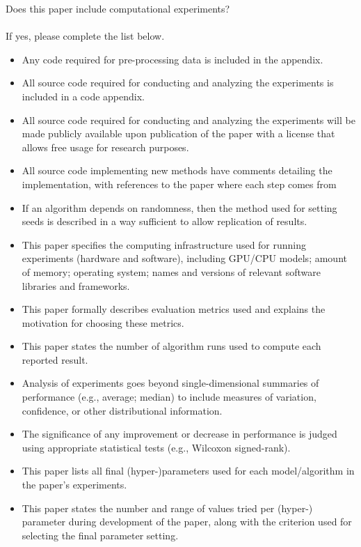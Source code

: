\noindent Does this paper include computational experiments? \yes \\ \\ 

\noindent If yes, please complete the list below.

\begin{itemize}

    \item Any code required for pre-processing data is included in the appendix. \yes 
    
    \item All source code required for conducting and analyzing the experiments is included in a code appendix. \yes 
    
    \item All source code required for conducting and analyzing the experiments will be made publicly available upon publication of the paper with a license that allows free usage for research purposes. \yes 
    
    \item All source code implementing new methods have comments detailing the implementation, with references to the paper where each step comes from \yes 
    
    \item If an algorithm depends on randomness, then the method used for setting seeds is described in a way sufficient to allow replication of results. \yes 
    
    \item This paper specifies the computing infrastructure used for running experiments (hardware and software), including GPU/CPU models; amount of memory; operating system; names and versions of relevant software libraries and frameworks. \yes 
    
    \item This paper formally describes evaluation metrics used and explains the motivation for choosing these metrics. \yes 
    
    \item This paper states the number of algorithm runs used to compute each reported result. \yes 
    
    \item Analysis of experiments goes beyond single-dimensional summaries of performance (e.g., average; median) to include measures of variation, confidence, or other distributional information. \yes 
    
    \item The significance of any improvement or decrease in performance is judged using appropriate statistical tests (e.g., Wilcoxon signed-rank). \yes 
    
    \item This paper lists all final (hyper-)parameters used for each model/algorithm in the paper’s experiments. \yes 
    
    \item This paper states the number and range of values tried per (hyper-) parameter during development of the paper, along with the criterion used for selecting the final parameter setting. \yes 

\end{itemize}



